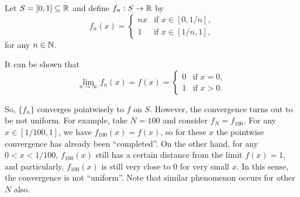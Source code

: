 \begin{enumerate}
Let \(S=[0,1]\subseteq \mathbb{R}\) and define \(f_n:S\to\mathbb{R}\) by
\[
f_n(x)=\begin{cases}
nx&\text{if \(x\in[0,1/n]\)}, \\
1&\text{if \(x\in[1/n,1]\)},
\end{cases}
\]
for any \(n\in\mathbb{N}\).
\begin{center}
\end{center}
It can be shown that
\[
\lim_{n\to \infty}f_n(x)=f(x)=\begin{cases}
0&\text{if \(x=0\)}, \\
1&\text{if \(x>0\)}.
\end{cases}
\]
\begin{center}
\end{center}
So, \(\{f_n\}\) converges pointwisely to \(f\) on \(S\). However, the
convergence turns out to be not uniform. For example, take \(N=100\) and
consider \(f_{N}=f_{100}\). For any \(x\in [1/100,1]\), we have
\(f_{100}(x)=f(x)\), so for these \(x\) the pointwise convergence has already
been ``completed''. On the other hand, for any \(0<x<1/100\), \(f_{100}(x)\)
still has a certain distance from the limit \(f(x)=1\), and particularly,
\(f_{100}(x)\) is still very close to \(0\) for very small \(x\). In this
sense, the convergence is not ``uniform''. Note that similar phenomenon occurs
for other \(N\) also.


\end{enumerate}
